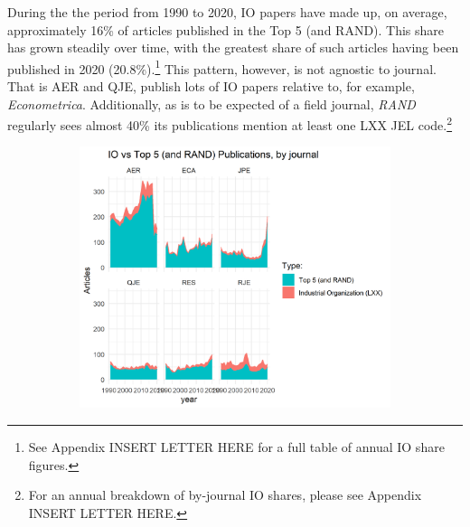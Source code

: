 \documentclass[11pt, letterpaper, twoside]{article}
\begin{document}
During the the period from 1990 to 2020, IO papers have made up, on average, approximately 16\% of articles published in the Top 5 (and RAND). This share has grown steadily over time, with the greatest share of such articles having been published in 2020 (20.8\%).\footnote{See Appendix INSERT LETTER HERE for a full table of annual IO share figures.} This pattern, however, is not agnostic to journal. That is AER and QJE, publish lots of IO papers relative to, for example, \textit{Econometrica}. Additionally, as is to be expected of a field journal, \textit{RAND} regularly sees almost 40\% its publications mention at least one LXX JEL code.\footnote{For an annual breakdown of by-journal IO shares, please see Appendix INSERT LETTER HERE.}\\

\begin{figure}
    \begin{subfigure}[h]{0.49\textwidth}
        \centering
        \includegraphics[width=\textwidth]{LXX-code-share-area-by-journal.png}
    \end{subfigure}
    \hfill
    \begin{subfigure}[h]{0.49\textwidth}
        \centering

\end{subfigure}
\end{figure}
\end{document}
